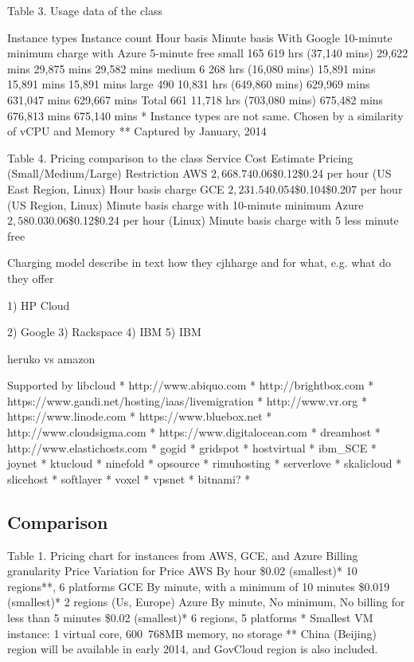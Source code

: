 \documentclass{sig-alternate}
\begin{document}
Table 3. Usage data of the class

Instance types	Instance count	Hour basis	Minute basis	With Google 10-minute minimum charge	with Azure 5-minute free
small	165	619 hrs (37,140 mins)	29,622 mins	29,875 mins	29,582 mins
medium	6	268 hrs (16,080 mins)	15,891 mins	15,891 mins	15,891 mins
large	490	10,831 hrs (649,860 mins)	629,969 mins	631,047 mins	629,667 mins
Total	661	11,718 hrs (703,080 mins)	675,482 mins	676,813 mins	675,140 mins
* Instance types are not same. Chosen by a similarity of vCPU and Memory
** Captured by January, 2014

Table 4. Pricing comparison to the class
Service	Cost Estimate	Pricing (Small/Medium/Large)	Restriction
AWS	$2,668.74	$0.06\$0.12\$0.24 per hour (US East Region, Linux)	Hour basis charge
GCE	$2,231.54	$0.054\$0.104\$0.207 per hour (US Region, Linux)	Minute basis charge with 10-minute minimum
Azure	$2,580.03	$0.06\$0.12\$0.24 per hour (Linux)	Minute basis charge with 5 less minute free

Charging model describe in text how they cjhharge and for what, e.g. what do they offer

1)	HP Cloud

2)	Google
3)	Rackspace
4)	IBM
5)	IBM

heruko vs amazon


Supported by libcloud
*	http://www.abiquo.com
*	http://brightbox.com
*	https://www.gandi.net/hosting/iaas/livemigration
*	http://www.vr.org
*	https://www.linode.com
*	https://www.bluebox.net
*	http://www.cloudsigma.com
*	https://www.digitalocean.com
*	dreamhost
*	http://www.elastichosts.com
*	gogid
*	gridspot
*	hostvirtual
*	ibm\_SCE
*	joynet
*	ktucloud
*	ninefold
*	opsource
*	rimuhosting
*	serverlove
*	skalicloud
*	slicehost
*	softlayer
*	voxel
*	vpsnet
*	bitnami?
*	
\subsection{Comparison}

Table 1. Pricing chart for instances from AWS, GCE, and Azure
	Billing granularity	Price	Variation for Price
AWS	By hour	\$0.02 (smallest)*	10 regions**, 6 platforms
GCE	By minute, with a minimum of 10 minutes	\$0.019 (smallest)*	2 regions (Us, Europe)
Azure	By minute, No minimum, No billing for less than 5 minutes	\$0.02 (smallest)*	6 regions, 5 platforms
* Smallest VM instance: 1 virtual core, 600~768MB memory, no storage
** China (Beijing) region will be available in early 2014, and GovCloud region is also included.
\end{document}
